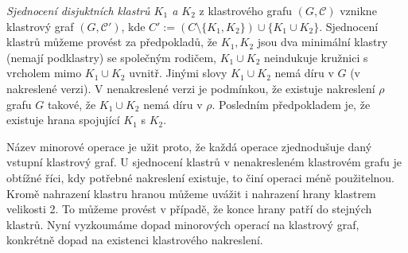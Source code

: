 \begin{defn}
\textit{Sjednocení disjuktních klastrů $K_1$ a $K_2$} z klastrového grafu $(G, \mathcal C)$ vznikne klastrový graf  $(G, \mathcal C')$, kde $C'  := (C\setminus \{K_1,K_2\}) \cup \{K_1 \cup K_2\}$. Sjednocení klastrů můžeme provést za předpokladů, že $K_1, K_2$ jsou dva minimální klastry (nemají podklastry) se společným rodičem, $K_1 \cup K_2$ neindukuje kružnici s vrcholem mimo $K_1 \cup K_2$ uvnitř. Jinými slovy $K_1 \cup K_2$ nemá díru v $G$ (v nakreslené verzi). V nenakreslené verzi je podmínkou, že existuje nakreslení $\rho$ grafu $G$ takové, že $K_1 \cup K_2$ nemá díru v $\rho$. Posledním předpokladem je, že existuje hrana spojující $K_1$ s $K_2$.
\end{defn}

Název minorové operace je užit proto, že každá operace zjednodušuje daný vstupní klastrový graf. U sjednocení klastrů v nenakresleném klastrovém grafu je obtížné říci, kdy potřebné nakreslení existuje, to činí operaci méně použitelnou. Kromě nahrazení klastru hranou můžeme uvážit i nahrazení hrany klastrem velikosti 2. To můžeme provést v případě, že konce hrany patří do stejných klastrů. Nyní vyzkoumáme dopad minorových operací na klastrový graf, konkrétně dopad na existenci klastrového nakreslení. 

